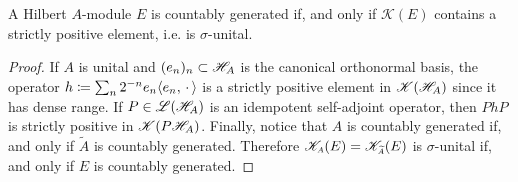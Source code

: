 \begin{proposicao}
    A Hilbert $A$-module $E$ is countably generated if, and only if $\mathscr K(E)$ contains a strictly positive element, i.e. is $\sigma$-unital.

    \begin{proof}
        If $A$ is unital and $(e_n)_n \subset \mathscr H_A$ is the canonical orthonormal basis, the operator $h \coloneqq \sum_n 2^{-n} e_n \langle {e_n},{\operatorname{\,\cdot\,}}\rangle$ is a strictly positive element in $\mathscr K(\mathscr H_A)$ since it has dense range. If $P\in \mathscr L(\mathscr H_A)$ is an idempotent self-adjoint operator, then $PhP$ is strictly positive in $\mathscr K(P\mathscr H_A)$. Finally, notice that $A$ is countably generated if, and only if $\widetilde{A}$ is countably generated. Therefore $\sub{\mathscr K}A(E) = \sub{\mathscr K}{\widetilde{A}}(E)$ is $\sigma$-unital if, and only if $E$ is countably generated.
    \end{proof}
\end{proposicao}




